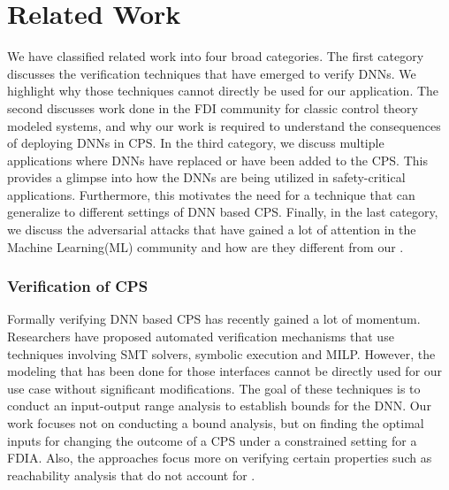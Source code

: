 \chapter{Related Work}
\label{relatedwork}

We have classified related work into four broad categories. The first category discusses the verification techniques that have emerged to verify DNNs. We highlight why those techniques cannot directly be used for our application. The second discusses work done in the FDI community for classic control theory modeled systems, and why our work is required to understand the consequences of deploying DNNs in CPS.  In the third category, we discuss multiple applications where DNNs have replaced or have been added to the CPS. This provides a glimpse into how the DNNs are being utilized in safety-critical applications. Furthermore, this motivates the need for a technique that can generalize to different settings of DNN based CPS. Finally, in the last category, we discuss the adversarial attacks that have gained a lot of attention in the Machine Learning(ML) community and how are they different from our \attack. 
\subsection{Verification of CPS}

Formally verifying DNN based CPS has recently gained a lot of momentum. Researchers have proposed automated verification mechanisms that use techniques involving SMT solvers, symbolic execution and MILP. However, the modeling that has been done for those interfaces cannot be directly used for our use case without significant modifications. The goal of these techniques is to conduct an input-output range analysis to establish bounds for the DNN. Our work focuses not on conducting a bound analysis, but on finding the optimal inputs for changing the outcome of a CPS under a constrained setting for a FDIA. Also, the approaches focus more on verifying certain properties such as reachability analysis that do not account for \attack.

